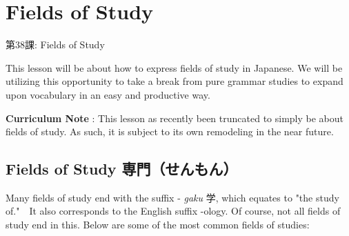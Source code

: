     
\chapter{Fields of Study}

\begin{center}
\begin{Large}
第38課: Fields of Study 
\end{Large}
\end{center}
 
\par{ This lesson will be about how to express fields of study in Japanese. We will be utilizing this opportunity to take a break from pure grammar studies to expand upon vocabulary in an easy and productive way. }

\par{\textbf{Curriculum Note }: This lesson as recently been truncated to simply be about fields of study. As such, it is subject to its own remodeling in the near future. }
      
\section{Fields of Study 専門（せんもん）}
 
\par{ Many fields of study end with the suffix - \emph{gaku }学, which equates to "the study of."  It also corresponds to the English suffix -ology. Of course, not all fields of study end in this. Below are some of the most common fields of studies: }

